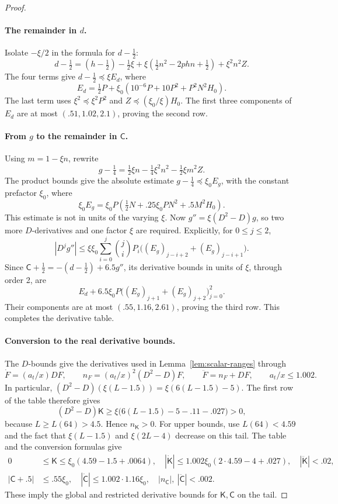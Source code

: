 \begin{proof}
\paragraph{The remainder in \(d\).}
Isolate \(-\xi/2\) in the formula for \(d-\tfrac12\):
\[
 d-\tfrac12
 =(h-\tfrac12)-\tfrac12\xi+
    \xi(\tfrac12n^2-2phn+\tfrac12)+\xi^2n^2Z.
\]
The four terms give \(d-\tfrac12\preccurlyeq\xi E_d\), where
\[
 E_d=\tfrac12P+
       \xi_0(10^{-6}P+10P^2+P^2N^2H_0).
\]
The last term uses \(\xi^2\preccurlyeq\xi^2P^2\) and
\(Z\preccurlyeq(\xi_0/\xi)H_0\).
The first three components of \(E_d\) are at most
\((.51,1.02,2.1)\), proving the second row.

\paragraph{From \(g\) to the remainder in \(\mathsf C\).}
Using \(m=1-\xi n\), rewrite
\[
 g-\tfrac14=\tfrac12\xi n-\tfrac14\xi^2n^2-\tfrac12\xi m^2Z.
\]
The product bounds give the absolute estimate
\(g-\tfrac14\preccurlyeq\xi_0E_g\), with the constant prefactor
\(\xi_0\), where
\[
 \xi_0E_g
 =\xi_0P(\tfrac12N+.25\xi_0PN^2+.5M^2H_0).
\]
This estimate is not in units of the varying \(\xi\).
Now \(g''=\xi(D^2-D)g\), so two more \(D\)-derivatives and one
factor \(\xi\) are required. Explicitly, for \(0\le j\le2\),
\[
 |D^jg''|
 \le \xi\xi_0\sum_{i=0}^j\binom ji P_i
       \big((E_g)_{j-i+2}+(E_g)_{j-i+1}\big).
\]
Since \(\mathsf C+\tfrac12=-(d-\tfrac12)+6.5g''\), its derivative
bounds in units of \(\xi\), through order 2, are
\[
 E_d+6.5\xi_0P
       \big((E_g)_{j+1}+(E_g)_{j+2}\big)_{j=0}^2.
\]
Their components are at most \((.55,1.16,2.61)\), proving the
third row. This completes the derivative table.

\paragraph{Conversion to the real derivative bounds.}
The \(D\)-bounds give the derivatives used in
Lemma~\ref{lem:scalar-ranges} through
\[
 \dot F=(a_t/x)DF,\qquad
 n_F=(a_t/x)^2(D^2-D)F,\qquad
 \ddot F=n_F+DF,\qquad a_t/x\le1.002.
\]
In particular,
\((D^2-D)(\xi(L-1.5))=\xi(6(L-1.5)-5)\).
The first row of the table therefore gives
\[
 (D^2-D)\mathsf K
 \ge\xi\big(6(L-1.5)-5-.11-.027\big)>0,
\]
because \(L\ge L(64)>4.5\). Hence \(n_{\mathsf K}>0\).
For upper bounds, use \(L(64)<4.59\) and the fact that
\(\xi(L-1.5)\) and \(\xi(2L-4)\) decrease on this tail. The table
and the conversion formulas give
\[
\begin{aligned}
 0&\le\mathsf K\le\xi_0(4.59-1.5+.0064),\quad
 |\dot{\mathsf K}|\le1.002\xi_0(2\cdot4.59-4+.027),\quad
 |\ddot{\mathsf K}|<.02,\\
 |\mathsf C+.5|&\le .55\xi_0,\quad |\dot{\mathsf C}|\le1.002\cdot1.16\xi_0,\quad
 |n_{\mathsf C}|,\ |\ddot{\mathsf C}|<.002.
\end{aligned}
\]
These imply the global and restricted derivative bounds for
\(\mathsf K,\mathsf C\) on the tail.


\end{proof}
